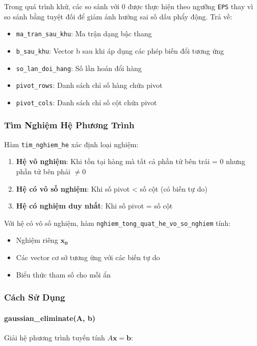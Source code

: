 \documentclass[12pt, a4paper, twoside]{article}
\begin{document}
Trong quá trình khử, các so sánh với 0 được thực hiện theo ngưỡng \texttt{EPS} thay vì so sánh bằng tuyệt đối để giảm ảnh hưởng sai số dấu phẩy động.
Trả về:
\begin{itemize}
    \item \texttt{ma\_tran\_sau\_khu}: Ma trận dạng bậc thang
    \item \texttt{b\_sau\_khu}: Vector b sau khi áp dụng các phép biến đổi tương ứng
    \item \texttt{so\_lan\_doi\_hang}: Số lần hoán đổi hàng
    \item \texttt{pivot\_rows}: Danh sách chỉ số hàng chứa pivot
    \item \texttt{pivot\_cols}: Danh sách chỉ số cột chứa pivot
\end{itemize}

\subsubsection{Tìm Nghiệm Hệ Phương Trình}

Hàm \texttt{tim\_nghiem\_he} xác định loại nghiệm:

\begin{enumerate}
    \item \textbf{Hệ vô nghiệm}: Khi tồn tại hàng mà tất cả phần tử bên trái = 0 nhưng phần tử bên phải $\neq 0$
    \item \textbf{Hệ có vô số nghiệm}: Khi số pivot < số cột (có biến tự do)
    \item \textbf{Hệ có nghiệm duy nhất}: Khi số pivot = số cột
\end{enumerate}

Với hệ có vô số nghiệm, hàm \texttt{nghiem\_tong\_quat\_he\_vo\_so\_nghiem} tính:
\begin{itemize}
    \item Nghiệm riêng $\mathbf{x_0}$
    \item Các vector cơ sở tương ứng với các biến tự do
    \item Biểu thức tham số cho mỗi ẩn
\end{itemize}

\subsubsection{Cách Sử Dụng}

\paragraph{gaussian\_eliminate(A, b)}
Giải hệ phương trình tuyến tính $A\mathbf{x} = \mathbf{b}$:
\end{document}
